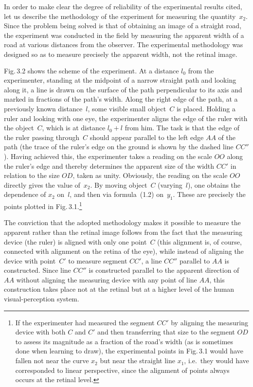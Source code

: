 In order to make clear the degree of reliability of the experimental results cited, let us
describe the methodology of the experiment for measuring the quantity~$x_2$.  Since the
problem being solved is that of obtaining an image of a straight road, the experiment was
conducted in the field by measuring the apparent width of a road at various distances from
the observer.  The experimental methodology was designed so as to measure precisely the
apparent width, not the retinal image.


Fig.\,3.2 shows the scheme of the experiment.  At a distance $l_0$ from the experimenter,
standing at the midpoint of a narrow straight path and looking along it, a line is drawn on
the surface of the path perpendicular to its axis and marked in fractions of the path's width.
Along the right edge of the path, at a previously known distance~$l$, some visible small
object~$C$ is placed.  Holding a ruler and looking with one eye, the experimenter aligns
the edge of the ruler with the object~$C$, which is at distance $l_0 + l$ from him.  The
task is that the edge of the ruler passing through~$C$ should appear parallel to the left
edge $AA$ of the path (the trace of the ruler's edge on the ground is shown by the dashed
line $CC''$).  Having achieved this, the experimenter takes a reading on the scale $OO$
along the ruler's edge and thereby determines the apparent size of the width $CC'$ in
relation to the size $OD$, taken as unity.  Obviously, the reading on the scale $OO$
directly gives the value of~$x_2$.  By moving object~$C$ (varying~$l$), one obtains the
dependence of $x_2$ on~$l$, and then via formula~(1.2) on~$y_1$.  These are precisely the
points plotted in Fig.\,3.1.\footnote{If the experimenter had measured the segment $CC'$
  by aligning the measuring device with both $C$ and $C'$ and then transferring that size
  to the segment $OD$ to assess its magnitude as a fraction of the road's width (as is
  sometimes done when learning to draw), the experimental points in Fig.\,3.1 would have
  fallen not near the curve $x_2$ but near the straight line $x_1$, i.e.\ they would have
  corresponded to linear perspective, since the alignment of points always occurs at the
  retinal level.}

The conviction that the adopted methodology makes it possible to measure the apparent
rather than the retinal image follows from the fact that the measuring device (the ruler) is
aligned with only one point~$C$ (this alignment is, of course, connected with alignment on
the retina of the eye), while instead of aligning the device with point~$C'$ to measure
segment $CC'$, a line $CC''$ parallel to $AA$ is constructed.  Since line $CC''$ is
constructed parallel to the apparent direction of $AA$ without aligning the measuring device
with any point of line $AA$, this construction takes place not at the retinal but at a higher
level of the human visual-perception system.

